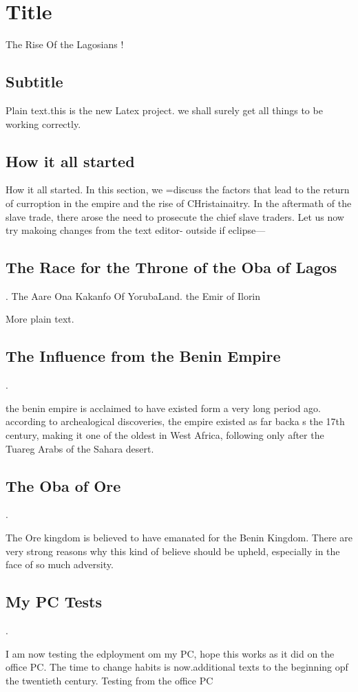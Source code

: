 \documentclass{article}
\begin{document}
\section{Title}The Rise Of the Lagosians !

\subsection{Subtitle}

Plain text.this is the new Latex project. we shall surely get all things to be
working correctly.

\subsection{How it all started}How it all started. In this section, we =discuss
the factors that lead to the return of curroption in the empire and the rise of
CHristainaitry. In the aftermath of the slave trade, there arose the need to
prosecute the chief slave traders.
Let us now try makoing changes from the text editor- outside if eclipse---


\subsection{The Race for the Throne of the Oba of Lagos}. The
Aare Ona Kakanfo Of YorubaLand. the Emir of Ilorin



More plain text.


\subsection{ The Influence from the Benin Empire}.

the benin empire is acclaimed to have existed form a very long period ago. according to archealogical discoveries, the empire existed as far backa s the 17th century, making it one of the oldest in West Africa, following only after the Tuareg Arabs of the Sahara desert.

\subsection{ The Oba of Ore}. 

The Ore kingdom is believed to have emanated for the Benin Kingdom. There are very strong reasons why this kind of believe should be upheld, especially in the face of so much adversity. 

\subsection{ My PC Tests}. 

I am now testing the edployment om my PC, hope this works as it did on the office PC. The time to change habits is now.additional texts to the beginning opf the twentieth century. Testing from the office PC
\end{document}
